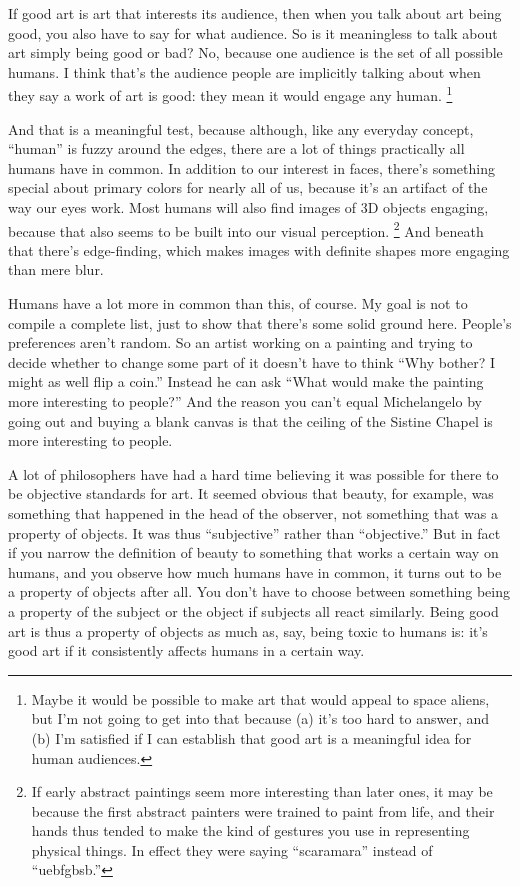 \documentclass[12pt]{book}
\begin{document}
If good art is art that interests its audience, then when you talk about
art being good, you also have to say for what audience. So is it
meaningless to talk about art simply being good or bad? No, because one
audience is the set of all possible humans. I think that's the audience
people are implicitly talking about when they say a work of art is good:
they mean it would engage any human. \footnote{Maybe it would be possible to make art that would appeal to
space aliens, but I'm not going to get into that because (a) it's too
hard to answer, and (b) I'm satisfied if I can establish that good art
is a meaningful idea for human audiences.}

And that is a meaningful test, because although, like any everyday
concept, ``human'' is fuzzy around the edges, there are a lot of things
practically all humans have in common. In addition to our interest in
faces, there's something special about primary colors for nearly all of
us, because it's an artifact of the way our eyes work. Most humans will
also find images of 3D objects engaging, because that also seems to be
built into our visual perception. \footnote{If early abstract paintings seem more interesting than later
ones, it may be because the first abstract painters were trained to
paint from life, and their hands thus tended to make the kind of
gestures you use in representing physical things. In effect they were
saying ``scaramara'' instead of ``uebfgbsb.''} And beneath
that there's edge-finding, which makes images with definite shapes more
engaging than mere blur.

Humans have a lot more in common than this, of course. My goal is not to
compile a complete list, just to show that there's some solid ground
here. People's preferences aren't random. So an artist working on a
painting and trying to decide whether to change some part of it doesn't
have to think ``Why bother? I might as well flip a coin.'' Instead he
can ask ``What would make the painting more interesting to people?'' And
the reason you can't equal Michelangelo by going out and buying a blank
canvas is that the ceiling of the Sistine Chapel is more interesting to
people.

A lot of philosophers have had a hard time believing it was possible for
there to be objective standards for art. It seemed obvious that beauty,
for example, was something that happened in the head of the observer,
not something that was a property of objects. It was thus ``subjective''
rather than ``objective.'' But in fact if you narrow the definition of
beauty to something that works a certain way on humans, and you observe
how much humans have in common, it turns out to be a property of objects
after all. You don't have to choose between something being a property
of the subject or the object if subjects all react similarly. Being good
art is thus a property of objects as much as, say, being toxic to humans
is: it's good art if it consistently affects humans in a certain way.
\end{document}
